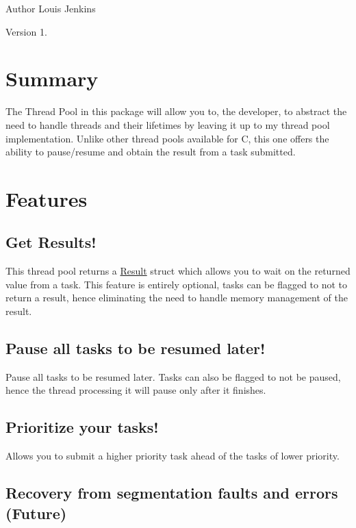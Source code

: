 \begin{DoxyAuthor}{Author}
Louis Jenkins 
\end{DoxyAuthor}
\begin{DoxyVersion}{Version}
1.
\end{DoxyVersion}
\hypertarget{index_list_summary}{}\section{Summary}\label{index_list_summary}
The Thread Pool in this package will allow you to, the developer, to abstract the need to handle threads and their lifetimes by leaving it up to my thread pool implementation. Unlike other thread pools available for C, this one offers the ability to pause/resume and obtain the result from a task submitted.\hypertarget{index_list_features}{}\section{Features}\label{index_list_features}
\hypertarget{index_results}{}\subsection{Get Results!}\label{index_results}
This thread pool returns a \hyperlink{struct_result}{Result} struct which allows you to wait on the returned value from a task. This feature is entirely optional, tasks can be flagged to not to return a result, hence eliminating the need to handle memory management of the result.\hypertarget{index_pause_and_resume}{}\subsection{Pause all tasks to be resumed later!}\label{index_pause_and_resume}
Pause all tasks to be resumed later. Tasks can also be flagged to not be paused, hence the thread processing it will pause only after it finishes.\hypertarget{index_priority}{}\subsection{Prioritize your tasks!}\label{index_priority}
Allows you to submit a higher priority task ahead of the tasks of lower priority.\hypertarget{index_recover}{}\subsection{Recovery from segmentation faults and errors (\+Future)}\label{index_recover}
